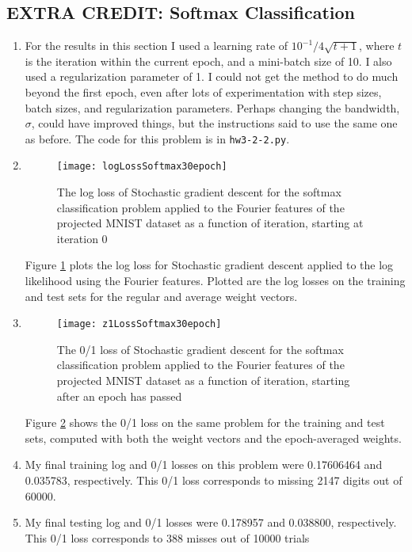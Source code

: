 \documentclass{article}
\begin{document}
\subsection{EXTRA CREDIT: Softmax Classification}
\begin{enumerate}
	\item For the results in this section I used a learning rate of $10^{-1} / 4\sqrt{t+1}$, where $t$ is the iteration within the current epoch, and a mini-batch size of 10. I also used a regularization parameter of 1. I could not get the method to do much beyond the first epoch, even after lots of experimentation with step sizes, batch sizes, and regularization parameters. Perhaps changing the bandwidth, $\sigma$, could have improved things, but the instructions said to use the same one as before. The code for this problem is in \texttt{hw3-2-2.py}.
	\item 
	\begin{figure}
        \centering
        \texttt{[image: logLossSoftmax30epoch]}
        \caption{The log loss of Stochastic gradient descent for the softmax classification problem applied to the Fourier features of the projected MNIST dataset as a function of iteration, starting at iteration 0}
        \label{fig:logLossSoftmax30epoch}
    \end{figure}
    Figure \ref{fig:logLossSoftmax30epoch} plots the log loss for Stochastic gradient descent applied to the log likelihood using the Fourier features. Plotted are the log losses on the training and test sets for the regular and average weight vectors.
    \item
    \begin{figure}
        \centering
        \texttt{[image: z1LossSoftmax30epoch]}
        \caption{The 0/1 loss of Stochastic gradient descent for the softmax classification problem applied to the Fourier features of the projected MNIST dataset as a function of iteration, starting after an epoch has passed}
        \label{fig:z1LossSoftmax30epoch}
    \end{figure}
    Figure \ref{fig:z1LossSoftmax30epoch} shows the 0/1 loss on the same problem for the training and test sets, computed with both the weight vectors and the epoch-averaged weights.
    \item My final training log and 0/1 losses on this problem were 0.17606464 and 0.035783, respectively. This 0/1 loss corresponds to missing 2147 digits out of 60000.
    \item My final testing log and 0/1 losses were 0.178957 and 0.038800, respectively. This 0/1 loss corresponds to 388 misses out of 10000 trials

\end{enumerate}
\end{document}
